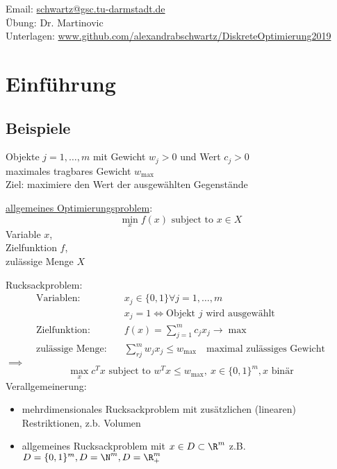 
Email: \url{schwartz@gsc.tu-darmstadt.de}\\
Übung: Dr. Martinovic\\
Unterlagen: \url{www.github.com/alexandrabschwartz/DiskreteOptimierung2019}

\section{Einführung}
\subsection{Beispiele}
\begin{beispiel}[Rucksackproblem]\enter
	Objekte $j=1,\dots,m$ mit Gewicht $w_{j}>0$ und Wert $c_{j}>0$\\
	maximales tragbares Gewicht $w_{\max}$\\
	Ziel: maximiere den Wert der ausgewählten Gegenstände
\end{beispiel} 

\underline{allgemeines Optimierungsproblem}:
\begin{equation*}
	\min_{x} f(x) \text{ subject to } x \in X
\end{equation*} 
Variable $x$,\\ 
Zielfunktion $f$, \\
zulässige Menge $X$

Rucksackproblem: 
\begin{align*}
\text{Variablen}:\quad & x_{j} \in \{0,1\} \forall j =1, \dots, m\\
				 & x_{j}=1 \iff \text{Objekt $j$ wird ausgewählt}\\
\text{Zielfunktion}:\quad& f(x)= \sum_{j=1}^{m} c_j x_{j}\rightarrow \max\\
\text{zulässige Menge}:\quad & \sum_{rj}^{m} w_j x_j \leq w_{\max}\quad \text{maximal zulässiges Gewicht}
\end{align*} 
$\implies$ 
\begin{equation*}
	\max_{x}c^Tx \text{ subject to } w^Tx \leq w_{\max},\ x \in \{0,1\}^m, x \text{ binär}
\end{equation*}
Verallgemeinerung:
\begin{itemize}
	\item mehrdimensionales Rucksackproblem mit zusätzlichen (linearen) Restriktionen, z.b. Volumen
	\item allgemeines Rucksackproblem mit $x\in D\subset \R^m$ z.B. $D=\{0,1\}^m, D=\N^m , D = \R_{+}^m$
\end{itemize} 

